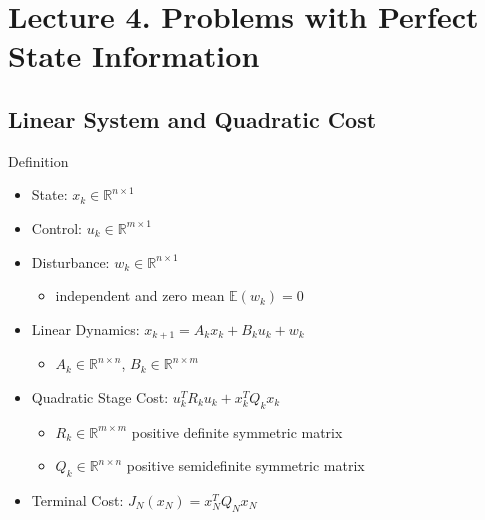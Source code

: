 \section{Lecture 4. Problems with Perfect State Information}
\subsection{Linear System and Quadratic Cost}
Definition
\begin{itemize}
    \item State: $x_k\in \mathbb{R}^{n\times 1}$
    \item Control: $u_k\in\mathbb{R}^{m\times 1}$
    \item Disturbance: $w_k\in\mathbb{R}^{n\times 1}$
    \begin{itemize}
        \item independent and zero mean $\mathbb{E}(w_k)=0$
    \end{itemize}
    \item Linear Dynamics: $x_{k+1}=A_kx_k+B_ku_k+w_k$
    \begin{itemize}
        \item $A_k \in \mathbb{R}^{n\times n}$, $B_k\in\mathbb{R}^{n\times m}$
    \end{itemize}
    \item Quadratic Stage Cost: $u_k^T R_k u_k+x_k^TQ_kx_k$
    \begin{itemize}
        \item $R_k\in\mathbb{R}^{m\times m}$ positive definite symmetric matrix
        \item $Q_k\in\mathbb{R}^{n\times n}$ positive semidefinite symmetric matrix
    \end{itemize}
    \item Terminal Cost: $J_N(x_N)=x_N^TQ_Nx_N$
\end{itemize}

